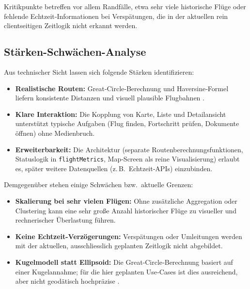 Kritikpunkte betreffen vor allem Randfälle, etwa sehr viele historische Flüge oder fehlende Echtzeit‑Informationen bei Verspätungen, die in der aktuellen rein clientseitigen Zeitlogik nicht erkannt werden.

\subsection{St\"arken-Schw\"achen-Analyse}

Aus technischer Sicht lassen sich folgende Stärken identifizieren:

\begin{itemize}
  \item \textbf{Realistische Routen:} Great‑Circle‑Berechnung und Haversine‑Formel liefern konsistente Distanzen und visuell plausible Flugbahnen \cite{movableTypeLatLong}.
  \item \textbf{Klare Interaktion:} Die Kopplung von Karte, Liste und Detailansicht unterstützt typische Aufgaben (Flug finden, Fortschritt prüfen, Dokumente öffnen) ohne Medienbruch.
  \item \textbf{Erweiterbarkeit:} Die Architektur (separate Routenberechnungsfunktionen, Statuslogik in \texttt{flightMetrics}, Map‑Screen als reine Visualisierung) erlaubt es, später weitere Datenquellen (z.\,B.\ Echtzeit‑APIs) einzubinden.
\end{itemize}

Demgegenüber stehen einige Schwächen bzw.\ aktuelle Grenzen:

\begin{itemize}
  \item \textbf{Skalierung bei sehr vielen Flügen:} Ohne zusätzliche Aggregation oder Clustering kann eine sehr große Anzahl historischer Flüge zu visueller und rechnerischer Überlastung führen.
  \item \textbf{Keine Echtzeit-Verzögerungen:} Verspätungen oder Umleitungen werden mit der aktuellen, ausschliesslich geplanten Zeitlogik nicht abgebildet.
  \item \textbf{Kugelmodell statt Ellipsoid:} Die Great‑Circle‑Berechnung basiert auf einer Kugelannahme; für die hier geplanten Use‑Cases ist dies ausreichend, aber nicht geodätisch hochpräzise \cite{movableTypeLatLong}.
\end{itemize}

